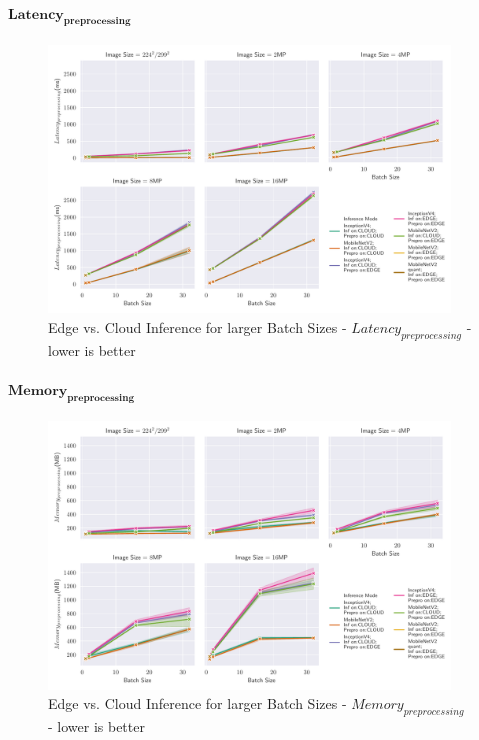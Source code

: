 \paragraph{$\mathbf{Latency_{preprocessing}}$}
\begin{figure}[!htb]
\centering
\includegraphics[width=0.95\textwidth]{./Bilder/single_plots/batch_size_plots/Effects_of_Batch_size_Preprocessing_Latencies.pdf}
\caption{Edge vs. Cloud Inference for larger Batch Sizes -  $Latency_{preprocessing}$ - lower is better}
\label{fig:BatchSizePreproLatency}
\end{figure}

\paragraph{$\mathbf{Memory_{preprocessing}}$}
\begin{figure}[!htb]
\centering
\includegraphics[width=0.95\textwidth]{./Bilder/single_plots/batch_size_plots/Effects_of_Batch_size_Preprocessing_Memory.pdf}
\caption{Edge vs. Cloud Inference for larger Batch Sizes -  $Memory_{preprocessing}$ - lower is better}
\label{fig:BatchSizePreproMemory}
\end{figure}

